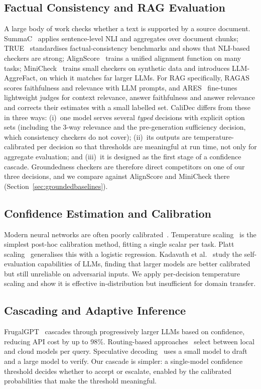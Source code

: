 \documentclass[twocolumn]{ICCKjournal}
\begin{document}
\subsection{Factual Consistency and RAG Evaluation}
A large body of work checks whether a text is supported by a source document. SummaC~\cite{laban2022summac} applies sentence-level NLI and aggregates over document chunks; TRUE~\cite{honovich2022true} standardises factual-consistency benchmarks and shows that NLI-based checkers are strong; AlignScore~\cite{zha2023alignscore} trains a unified alignment function on many tasks; MiniCheck~\cite{tang2024minicheck} trains small checkers on synthetic data and introduces LLM-AggreFact, on which it matches far larger LLMs. For RAG specifically, RAGAS~\cite{es2024ragas} scores faithfulness and relevance with LLM prompts, and ARES~\cite{saadfalcon2024ares} fine-tunes lightweight judges for context relevance, answer faithfulness and answer relevance and corrects their estimates with a small labelled set. CaliDec differs from these in three ways: (i)~one model serves several \emph{typed} decisions with explicit option sets (including the 3-way relevance and the pre-generation sufficiency decision, which consistency checkers do not cover); (ii)~its outputs are temperature-calibrated per decision so that thresholds are meaningful at run time, not only for aggregate evaluation; and (iii)~it is designed as the first stage of a confidence cascade. Groundedness checkers are therefore direct competitors on one of our three decisions, and we compare against AlignScore and MiniCheck there (Section~\ref{sec:groundedbaselines}).

\subsection{Confidence Estimation and Calibration}
Modern neural networks are often poorly calibrated~\cite{guo2017calibration}. Temperature scaling~\cite{guo2017calibration} is the simplest post-hoc calibration method, fitting a single scalar per task. Platt scaling~\cite{platt1999probabilistic} generalises this with a logistic regression. Kadavath et al.~\cite{kadavath2022language} study the self-evaluation capabilities of LLMs, finding that larger models are better calibrated but still unreliable on adversarial inputs. We apply per-decision temperature scaling and show it is effective in-distribution but insufficient for domain transfer.

\subsection{Cascading and Adaptive Inference}
FrugalGPT~\cite{chen2023frugalgpt} cascades through progressively larger LLMs based on confidence, reducing API cost by up to 98\%. Routing-based approaches~\cite{ding2024hybrid} select between local and cloud models per query. Speculative decoding~\cite{leviathan2023fast} uses a small model to draft and a large model to verify. Our cascade is simpler: a single-model confidence threshold decides whether to accept or escalate, enabled by the calibrated probabilities that make the threshold meaningful.
\end{document}
